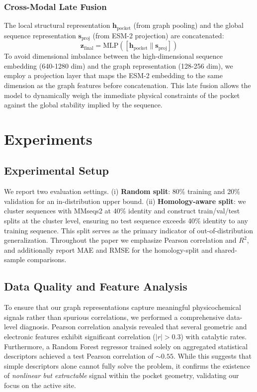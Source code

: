 \documentclass[11pt]{article}
\begin{document}
\subsubsection{Cross-Modal Late Fusion}
The local structural representation $\mathbf{h}_{\text{pocket}}$ (from graph pooling) and the global sequence representation $\mathbf{s}_{\text{proj}}$ (from ESM-2 projection) are concatenated:
\begin{equation}
    \mathbf{z}_{\text{final}} = \text{MLP}([\mathbf{h}_{\text{pocket}} \parallel \mathbf{s}_{\text{proj}}])
\end{equation}
To avoid dimensional imbalance between the high-dimensional sequence embedding (640-1280 dim) and the graph representation (128-256 dim), we employ a projection layer that maps the ESM-2 embedding to the same dimension as the graph features before concatenation. This late fusion allows the model to dynamically weigh the immediate physical constraints of the pocket against the global stability implied by the sequence.

\section{Experiments}
\label{sec:experiments}

\subsection{Experimental Setup}
We report two evaluation settings. (i) \textbf{Random split}: 80\% training and 20\% validation for an in-distribution upper bound. (ii) \textbf{Homology-aware split}: we cluster sequences with MMseqs2 at 40\% identity and construct train/val/test splits at the cluster level, ensuring no test sequence exceeds 40\% identity to any training sequence. This split serves as the primary indicator of out-of-distribution generalization. Throughout the paper we emphasize Pearson correlation and $R^2$, and additionally report MAE and RMSE for the homology-split and shared-sample comparisons.

\subsection{Data Quality and Feature Analysis}
\label{sec:data_analysis}

To ensure that our graph representations capture meaningful physicochemical signals rather than spurious correlations, we performed a comprehensive data-level diagnosis. Pearson correlation analysis revealed that several geometric and electronic features exhibit significant correlation ($|r| > 0.3$) with catalytic rates. Furthermore, a Random Forest regressor trained solely on aggregated statistical descriptors achieved a test Pearson correlation of $\sim0.55$. While this suggests that simple descriptors alone cannot fully solve the problem, it confirms the existence of \emph{nonlinear but extractable} signal within the pocket geometry, validating our focus on the active site.
\end{document}

